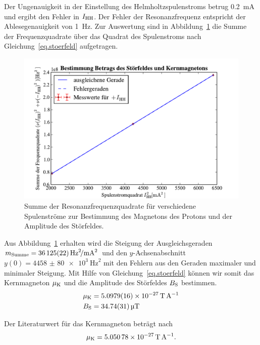 \documentclass[paper=a4,
	fontsize=10pt,
	DIV=18,
	twocolumn,
	parskip=half
	]{scrartcl}
\numberwithin{equation}{section}    %
\begin{document}
Der Ungenauigkeit in der Einstellung des Helmholtzspulenstroms betrug \SI{0.2}{\milli\ampere} und ergibt den Fehler in $I_{\rm HH}$. Der Fehler der Resonanzfrequenz entspricht der Ablesegenauigkeit von \SI{1}{\hertz}.
Zur Auswertung sind in Abbildung~\ref{fig.stoerfeld} die Summe der Frequenzquadrate über das Quadrat des Spulenstroms nach Gleichung~\eqref{eq.stoerfeld} aufgetragen.

\begin{figure}[htp]
	\begin{center}
		\includegraphics[width=\columnwidth]{Data-Plots/10-helmholtz-summe.pdf}
		\caption{Summe der Resonanzfrequenzquadrate für verschiedene Spulenströme zur Bestimmung des Magnetons des Protons und der Amplitude des Störfeldes.}
		\label{fig.stoerfeld}
	\end{center}
\end{figure}

Aus Abbildung~\ref{fig.stoerfeld} erhalten wird die Steigung der Ausgleichsgeraden $m_{\rm Summe} = \SI[per-mode=symbol]{36125(22)}{\hertz\squared\per\milli\ampere\squared} $ und den $y$-Achsenabschnitt $y(0) = \SI{4458(80)e3}{\hertz\squared}$ mit den Fehlern aus den Geraden maximaler und minimaler Steigung.
Mit Hilfe von Gleichung~\eqref{eq.stoerfeld} können wir somit das Kernmagneton $\mu_{\rm K}$ und die Amplitude des Störfeldes $B_{\rm S}$ bestimmen.
\begin{align}
	\mu_{\rm K} &= \SI{5.0979(16)e-27}{\tesla\per\ampere}\\
	B_{\rm S} &=  \SI{34.74(31)}{\micro\tesla}
\end{align}

Der Literaturwert für das Kernmagneton beträgt nach~\citet{codata}
\begin{equation}
	\mu_{\rm K} = \SI{5.05078e-27}{\tesla\per\ampere}.
\end{equation}
\end{document}
